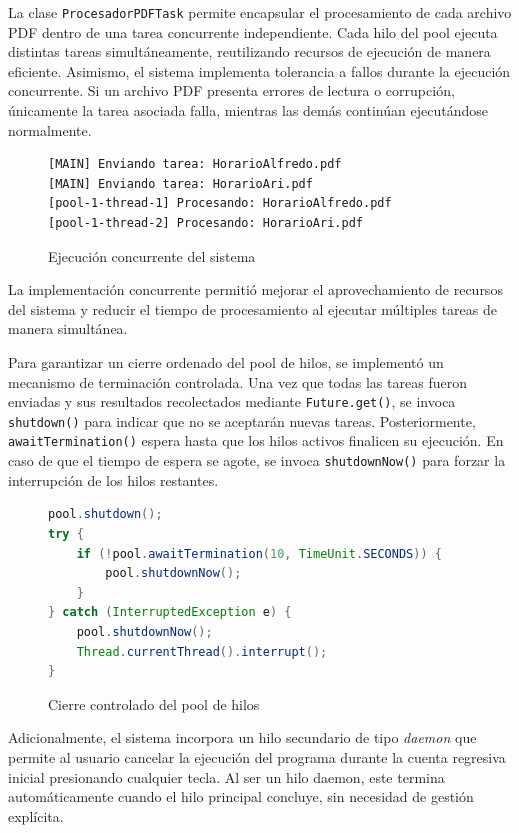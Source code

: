 La clase \texttt{ProcesadorPDFTask} permite encapsular el procesamiento de cada archivo PDF dentro de una tarea concurrente independiente. Cada hilo del pool ejecuta distintas tareas simultáneamente, reutilizando recursos de ejecución de manera eficiente.
Asimismo, el sistema implementa tolerancia a fallos durante la ejecución concurrente. Si un archivo PDF presenta errores de lectura o corrupción, únicamente la tarea asociada falla, mientras las demás continúan ejecutándose normalmente.
\vspace{-0.5cm}
\begin{figure}[H]
    \centering
    \caption{Ejecución concurrente del sistema}
    \label{code:salida_hilos}
    \begin{verbatim}
[MAIN] Enviando tarea: HorarioAlfredo.pdf
[MAIN] Enviando tarea: HorarioAri.pdf
[pool-1-thread-1] Procesando: HorarioAlfredo.pdf
[pool-1-thread-2] Procesando: HorarioAri.pdf
    \end{verbatim}
\end{figure}
La implementación concurrente permitió mejorar el aprovechamiento de recursos del sistema y reducir el tiempo de procesamiento al ejecutar múltiples tareas de manera simultánea.

Para garantizar un cierre ordenado del pool de hilos, se implementó un mecanismo de terminación controlada. Una vez que todas las tareas fueron enviadas y sus resultados recolectados mediante \texttt{Future.get()}, se invoca \texttt{shutdown()} para indicar que no se aceptarán nuevas tareas. Posteriormente, \texttt{awaitTermination()} espera hasta que los hilos activos finalicen su ejecución. En caso de que el tiempo de espera se agote, se invoca \texttt{shutdownNow()} para forzar la interrupción de los hilos restantes.
\vspace{-0.2cm}
\begin{figure}[H]
    \centering
    \caption{Cierre controlado del pool de hilos}
    \label{code:shutdown_pool}
    \vspace{-0.2cm}
    \begin{lstlisting}[language=Java]
pool.shutdown();
try {
    if (!pool.awaitTermination(10, TimeUnit.SECONDS)) {
        pool.shutdownNow();
    }
} catch (InterruptedException e) {
    pool.shutdownNow();
    Thread.currentThread().interrupt();
}
    \end{lstlisting}
\end{figure}

Adicionalmente, el sistema incorpora un hilo secundario de tipo \textit{daemon} que permite al usuario cancelar la ejecución del programa durante la cuenta regresiva inicial presionando cualquier tecla. Al ser un hilo daemon, este termina automáticamente cuando el hilo principal concluye, sin necesidad de gestión explícita.

